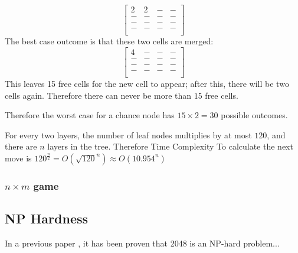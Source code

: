\documentclass{article}
\begin{document}
\[
\begin{bmatrix}
    2&2&-&-\\
    -&-&-&-\\
    -&-&-&-\\
    -&-&-&-\\
\end{bmatrix}
\]
The best case outcome is that these two cells are merged:
\[
\begin{bmatrix}
    4&-&-&-\\
    -&-&-&-\\
    -&-&-&-\\
    -&-&-&-\\
\end{bmatrix}
\]
This leaves 15 free cells for the new cell to appear; after this, there will be two cells again.
Therefore there can never be more than $15$ free cells.

Therefore the worst case for a chance node has $15\times2=30$ possible outcomes.

For every two layers, the number of leaf nodes multiplies by at most $120$, and there are $n$ layers in the tree.
Therefore Time Complexity To calculate the next move is $120^\frac n 2 = O(\sqrt{120}^n) \approx O(10.954^n)$
\subsubsection{$n \times m$ game}
\subsection{NP Hardness}
\label{subsec:np_hardness}
In a previous paper \cite{LANGERMAN201817}, it has been proven that 2048 is an NP-hard problem...
\newpage


\end{document}
